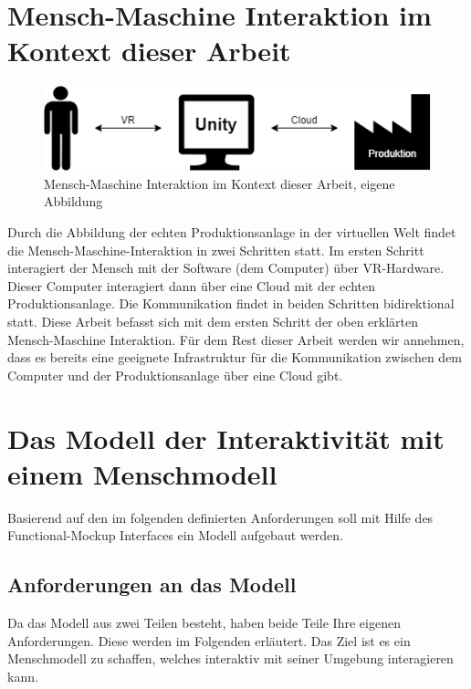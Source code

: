 \section{Mensch-Maschine Interaktion im Kontext dieser Arbeit}\label{sec:MMInteraktion}
\begin{figure}[h]
	\centering
	\includegraphics[width=0.7\linewidth]{Bilder/A19_MMI}
	\caption{Mensch-Maschine Interaktion im Kontext dieser Arbeit, eigene Abbildung}
	\label{fig:MMI}
\end{figure}
\noindent Durch die Abbildung der echten Produktionsanlage in der virtuellen Welt findet die Mensch-Maschine-Interaktion in zwei Schritten statt. Im ersten Schritt interagiert der Mensch mit der Software (dem Computer) über VR-Hardware. Dieser Computer interagiert dann über eine Cloud mit der echten Produktionsanlage. Die Kommunikation findet in beiden Schritten bidirektional statt.
\newline\newline
Diese Arbeit befasst sich mit dem ersten Schritt der oben erklärten Mensch-Maschine Interaktion. Für dem Rest dieser Arbeit werden wir annehmen, dass es bereits eine geeignete Infrastruktur für die Kommunikation zwischen dem Computer und der Produktionsanlage über eine Cloud gibt.

\section{Das Modell der Interaktivität mit einem Menschmodell}\label{sec:ModellAufbau}
Basierend auf den im folgenden definierten Anforderungen soll mit Hilfe des Functional-Mockup Interfaces ein Modell aufgebaut werden.

\subsection{Anforderungen an das Modell}\label{sec:AnforderungenModell}
Da das Modell aus zwei Teilen besteht, haben beide Teile Ihre eigenen Anforderungen. Diese werden im Folgenden erläutert. Das Ziel ist es ein Menschmodell zu schaffen, welches interaktiv mit seiner Umgebung interagieren kann.

